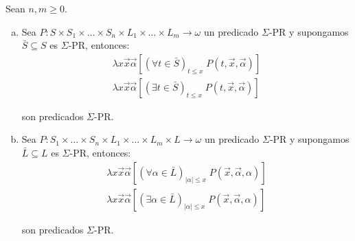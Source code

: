   \begin{lemma}
    \PN Sean $n, m \geq 0$.

    \begin{enumerate}[a)]
      \item Sea $P: S \times S_{1} \times \dotsc \times S_{n} \times L_{1} \times \dotsc \times L_{m} \rightarrow
        \omega$ un predicado $\Sigma$-PR y supongamos $\bar{S} \subseteq S$ es $\Sigma$-PR, entonces:
        \begin{eqnarray*}
          \lambda x\vec{x}\vec{\alpha} \left[(\forall t \in \bar{S})_{t\leq x} \; P(t,\vec{x},\vec{\alpha})
            \right] \\
          \lambda x\vec{x}\vec{\alpha} \left[(\exists t \in \bar{S})_{t\leq x} \; P(t,\vec{x},\vec{\alpha})
            \right]
        \end{eqnarray*}

        \PN son predicados $\Sigma$-PR.

      \item Sea $P: S_{1} \times \dotsc \times S_{n} \times L_{1} \times \dotsc \times L_{m} \times L \rightarrow
        \omega$ un predicado $\Sigma$-PR y supongamos $\bar{L} \subseteq L$ es $\Sigma$-PR, entonces:
        \begin{eqnarray*}
          \lambda x\vec{x}\vec{\alpha} \left[(\forall \alpha \in \bar{L})_{\lvert \alpha \rvert
            \leq x} \; P(\vec{x},\vec{\alpha},\alpha)\right] \\
          \lambda x\vec{x}\vec{\alpha} \left[(\exists \alpha \in \bar{L})_{\lvert \alpha \rvert
            \leq x} \; P(\vec{x},\vec{\alpha},\alpha)\right]
        \end{eqnarray*}

        \PN son predicados $\Sigma$-PR.
    \end{enumerate}
  \end{lemma}
